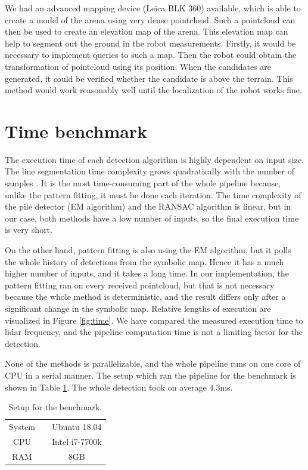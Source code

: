 We had an advanced mapping device (Leica BLK 360) available, which is able to create a model of the arena using very dense pointcloud. Such a pointcloud can then be used to create an elevation map of the arena. This elevation map can help to segment out the ground in the robot measurements. Firstly, it would be necessary to implement queries to such a map. Then the robot could obtain the transformation of pointcloud using its position. When the candidates are generated, it could be verified whether the candidate is above the terrain. This method would work reasonably well until the localization of the robot works fine.

\section{Time benchmark}
The execution time of each detection algorithm is highly dependent on input size. The line segmentation time complexity grows quadratically with the number of samples \cite{hershberger2000}. It is the most time-consuming part of the whole pipeline because, unlike the pattern fitting, it must be done each iteration. The time complexity of the pile detector (EM algorithm) and the RANSAC algorithm is linear, but in our case, both methods have a low number of inputs, so the final execution time is very short. 

On the other hand, pattern fitting is also using the EM algorithm, but it polls the whole history of detections from the symbolic map. Hence it has a much higher number of inputs, and it takes a long time. In our implementation, the pattern fitting ran on every received pointcloud, but that is not necessary because the whole method is deterministic, and the result differs only after a significant change in the symbolic map. Relative lengths of execution are visualized in Figure \ref{fig:time}. We have compared the measured execution time to lidar frequency, and the pipeline computation time is not a limiting factor for the detection.

None of the methods is parallelizable, and the whole pipeline runs on one core of CPU in a serial manner. The setup which ran the pipeline for the benchmark is shown in Table \ref{tab:benchmark}. The whole detection took on average $4.3$ms.

\begin{table}[H]
	\centering
	\caption{Setup for the benchmark.}
	\begin{tabular}{ccc}
		\toprule
		System &\quad& Ubuntu 18.04 \\
		CPU &\quad& Intel i7-7700k  \\
		RAM &\quad& 8GB \\
		\bottomrule
	\end{tabular}
	\label{tab:benchmark}
\end{table}

